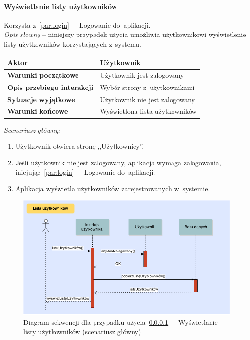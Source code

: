 \paragraph{Wyświetlanie listy użytkowników\newline}
\label{par:userList}
Korzysta z~\ref{par:login}~--~Logowanie do~aplikacji.\\

\textit{Opis słowny} -- niniejszy przypadek użycia umożliwia użytkownikowi wyświetlenie listy użytkowników
korzystających z~systemu.

\begin{longtable}{|p{5cm}|p{7cm}|}
  \hline \textbf{Aktor} & Użytkownik \\ \hline
  \textbf{Warunki początkowe} & Użytkownik jest zalogowany \\ \hline
  \textbf{Opis przebiegu interakcji} & Wybór strony z~użytkownikami \\ \hline
  \textbf{Sytuacje wyjątkowe} & Użytkownik nie jest zalogowany \\ \hline
  \textbf{Warunki końcowe} & Wyświetlona lista użytkowników \\ \hline
\end{longtable}

\noindent \textit{Scenariusz główny:}
\begin{enumerate}
  \item Użytkownik otwiera stronę ,,Użytkownicy''.
  \item Jeśli użytkownik nie jest zalogowany, aplikacja wymaga zalogowania, inicjując~\ref{par:login}~--~Logowanie do~aplikacji.
  \item Aplikacja wyświetla użytkowników zarejestrowanych w~systemie.
\end{enumerate}

\begin{figure}[H]
  \includegraphics[width=\textwidth]{images/listuj_uzytkownikow.png}
  \caption{Diagram sekwencji dla przypadku użycia~\ref{par:userList}~--~Wyświetlanie listy użytkowników (scenariusz główny)}
\end{figure}

